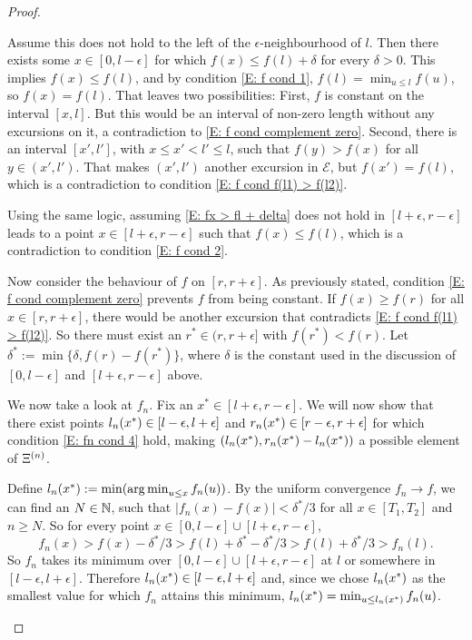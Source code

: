 \begin{proof}
\begin{proofpart}
Assume this does not hold to the left of the $\epsilon$-neighbourhood of $l$.
Then there exists some $x \in [0, l-\epsilon]$
for which $f(x) \leq f(l) + \delta$ for every $\delta > 0$.
This implies $f(x) \leq f(l)$,
and by condition \eqref{E: f cond 1},
$f(l) = \min_{u \leq l}f(u)$,
so $f(x) = f(l)$.
That leaves two possibilities:
First, $f$ is constant on the interval $[x,l]$.
But this would be an interval of non-zero length without any excursions on it,
a contradiction to \eqref{E: f cond complement zero}.
Second, there is an interval
$[x', l']$, with $x\leq x'<l' \leq l$,
such that $f(y) > f(x)$ for all $y \in (x',l')$.
That makes $(x',l')$ another excursion in $\mathcal{E}$,
but $f(x') = f(l)$,
which is a contradiction to condition \eqref{E: f cond f(l1) > f(l2)}.

Using the same logic,
assuming \eqref{E: fx > fl + delta} does not hold in $[l + \epsilon, r- \epsilon]$
leads to a point $x \in [l + \epsilon, r- \epsilon]$
such that $f(x) \leq f(l)$,
which is a contradiction to condition \eqref{E: f cond 2}.

Now consider the behaviour of $f$ on $[r, r + \epsilon]$.
As previously stated, 
condition \eqref{E: f cond complement zero} prevents $f$ from being constant.
If $f(x) \geq f(r)$ for all $x \in [r, r + \epsilon]$,
there would be another excursion that contradicts \eqref{E: f cond f(l1) > f(l2)}.
So there must exist an $r^* \in (r, r + \epsilon]$ with $f(r^*) < f(r)$.
Let $\delta^* := \min\{ \delta, f(r) - f(r^*) \}$,
where $\delta$ is the constant used in the discussion of
$[0, l-\epsilon]$ and $[l+\epsilon, r-\epsilon]$ above.


We now take a look at $f_n$.
Fix an $x^* \in [l+\epsilon, r-\epsilon]$.
We will now show that there exist points
$l_n(x^*) \in [l-\epsilon, l+\epsilon]$
and 
$r_n(x^*) \in [r-\epsilon, r+\epsilon]$
for which condition \eqref{E: fn cond 4} hold,
making $(l_n(x^*), r_n(x^*)- l_n(x^*))$ a possible element of $\Xi^{(n)}$.

Define $l_n(x^*) := \min(\operatorname*{arg\,min}_{u \leq x} f_n(u))$.
By the uniform convergence $f_n \rightarrow f$,
we can find an $N \in \mathbb{N}$,
such that $|f_n(x) - f(x)| < \delta^* / 3$ for all
$x \in [T_1, T_2]$ and $n \geq N$.
So for every point $x \in [0, l - \epsilon]\cup[l + \epsilon, r - \epsilon]$,
\begin{equation} \label{E: fn(x) > fn(l)}
f_n(x) > f(x) - \delta^* / 3 > f(l) + \delta^* - \delta^* / 3 > f(l) + \delta^* / 3 > f_n(l).
\end{equation}
So $f_n$ takes its minimum over 
$[0, l - \epsilon]\cup[l + \epsilon, r - \epsilon]$
at $l$ or somewhere in $[l-\epsilon, l+\epsilon]$.
Therefore $l_n(x^*) \in [l-\epsilon, l+\epsilon]$ and, 
since we chose $l_n(x^*)$ as the smallest value for which $f_n$ attains this minimum, $l_n(x^*) = \min_{u \leq l_n(x^*)} f_n(u)$.


\end{proofpart}
\end{proof}

